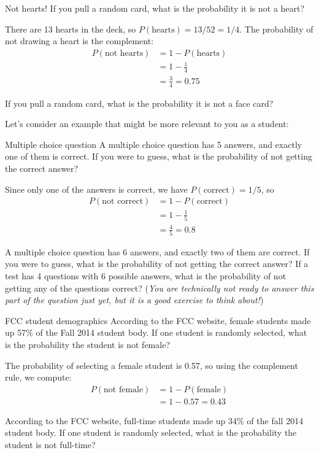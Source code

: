 \begin{example}[https://www.youtube.com/watch?v=YpjdHUsKaow]{Not hearts!}
If you pull a random card, what is the probability it is not a
heart? 

\sol
There are 13 hearts in the deck, so $P(\mbox{hearts}) = 13/52 = 1/4$. The probability of not drawing a heart is the complement:
\begin{align*}
P(\mbox{not hearts}) &= 1 - P(\mbox{hearts})\\
&= 1 - \frac{1}{4}\\
&= \boxed{\frac{3}{4} = 0.75}
\end{align*}
\end{example}

\begin{try}
If you pull a random card, what is the probability it is not a face card?
\end{try}

Let's consider an example that might be more relevant to you as a student: 

\begin{example}[https://www.youtube.com/watch?v=munZCN0L2uA]{Multiple choice question}
A multiple choice question has 5 answers, and exactly one of them is correct. If you were to guess, what is the probability of not getting the correct answer? 

\sol
Since only one of the answers is correct, we have $P(\mbox{correct}) = 1/5$, so
\begin{align*}
P(\mbox{not correct}) &= 1 - P(\mbox{correct})\\
&= 1 - \frac{1}{5}\\
&= \boxed{\frac{4}{5} = 0.8}
\end{align*}
\end{example}

\begin{try}
A multiple choice question has 6 answers, and exactly two of them are correct. If you were to guess, what is the probability of not getting the correct answer?  If a test has 4 questions with 6 possible answers, what is the probability of not getting any of the questions correct? (\emph{You are technically not ready to answer this part of the question just yet, but it is a good exercise to think about!})
\end{try}
\pagebreak

\begin{example}[https://www.youtube.com/watch?v=ICbVL7wFRYU]{FCC student demographics}
According to the FCC website, female students made up 57\% of the Fall 2014 student body. If one student is randomly selected, what is the probability the student is not female? 

\sol
The probability of selecting a female student is 0.57, so using the complement rule, we compute:
\begin{align*}
P(\mbox{not female}) &= 1 - P(\mbox{female})\\
&= 1 - 0.57 = \boxed{0.43}
\end{align*}
\end{example}

\begin{try}
According to the FCC website, full-time students made up 34\% of the fall 2014 student body. If one student is randomly selected, what is the probability the student is not full-time?
\end{try}